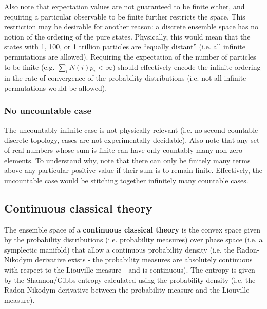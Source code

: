 Also note that expectation values are not guaranteed to be finite either, and requiring a particular observable to be finite further restricts the space. This restriction may be desirable for another reason: a discrete ensemble space has no notion of the ordering of the pure states. Physically, this would mean that the states with 1, 100, or 1 trillion particles are ``equally distant'' (i.e. all infinite permutations are allowed). Requiring the expectation of the number of particles to be finite (e.g. $\sum_i N(i) p_i < \infty$) should effectively encode the infinite ordering in the rate of convergence of the probability distributions (i.e. not all infinite permutations would be allowed).

\subsubsection{No uncountable case}

The uncountably infinite case is not physically relevant (i.e. no second countable discrete topology, cases are not experimentally decidable). Also note that any set of real numbers whose sum is finite can have only countably many non-zero elements. To understand why, note that there can only be finitely many terms above any particular positive value if their sum is to remain finite. Effectively, the uncountable case would be stitching together infinitely many countable cases.

\subsection{Continuous classical theory}

\begin{defn}
	The ensemble space of a \textbf{continuous classical theory} is the convex space given by the probability distributions (i.e. probability measures) over phase space (i.e. a symplectic manifold) that allow a continuous probability density (i.e. the Radon-Nikodym derivative exists - the probability measures are absolutely continuous with respect to the Liouville measure - and is continuous). The entropy is given by the Shannon/Gibbs entropy calculated using the probability density (i.e. the Radon-Nikodym derivative between the probability measure and the Liouville measure).
\end{defn}

